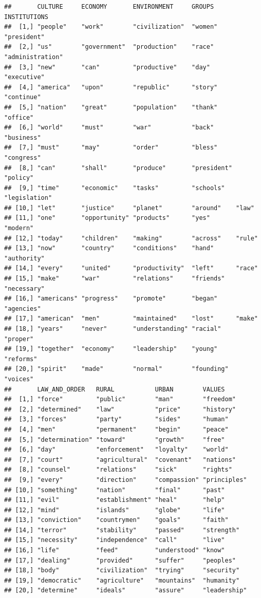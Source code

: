 \documentclass[
]{book}
\begin{document}
\begin{verbatim}
##       CULTURE     ECONOMY       ENVIRONMENT     GROUPS      INSTITUTIONS    
##  [1,] "people"    "work"        "civilization"  "women"     "president"     
##  [2,] "us"        "government"  "production"    "race"      "administration"
##  [3,] "new"       "can"         "productive"    "day"       "executive"     
##  [4,] "america"   "upon"        "republic"      "story"     "continue"      
##  [5,] "nation"    "great"       "population"    "thank"     "office"        
##  [6,] "world"     "must"        "war"           "back"      "business"      
##  [7,] "must"      "may"         "order"         "bless"     "congress"      
##  [8,] "can"       "shall"       "produce"       "president" "policy"        
##  [9,] "time"      "economic"    "tasks"         "schools"   "legislation"   
## [10,] "let"       "justice"     "planet"        "around"    "law"           
## [11,] "one"       "opportunity" "products"      "yes"       "modern"        
## [12,] "today"     "children"    "making"        "across"    "rule"          
## [13,] "now"       "country"     "conditions"    "hand"      "authority"     
## [14,] "every"     "united"      "productivity"  "left"      "race"          
## [15,] "make"      "war"         "relations"     "friends"   "necessary"     
## [16,] "americans" "progress"    "promote"       "began"     "agencies"      
## [17,] "american"  "men"         "maintained"    "lost"      "make"          
## [18,] "years"     "never"       "understanding" "racial"    "proper"        
## [19,] "together"  "economy"     "leadership"    "young"     "reforms"       
## [20,] "spirit"    "made"        "normal"        "founding"  "voices"        
##       LAW_AND_ORDER   RURAL           URBAN        VALUES      
##  [1,] "force"         "public"        "man"        "freedom"   
##  [2,] "determined"    "law"           "price"      "history"   
##  [3,] "forces"        "party"         "sides"      "human"     
##  [4,] "men"           "permanent"     "begin"      "peace"     
##  [5,] "determination" "toward"        "growth"     "free"      
##  [6,] "day"           "enforcement"   "loyalty"    "world"     
##  [7,] "court"         "agricultural"  "covenant"   "nations"   
##  [8,] "counsel"       "relations"     "sick"       "rights"    
##  [9,] "every"         "direction"     "compassion" "principles"
## [10,] "something"     "nation"        "final"      "past"      
## [11,] "evil"          "establishment" "heal"       "help"      
## [12,] "mind"          "islands"       "globe"      "life"      
## [13,] "conviction"    "countrymen"    "goals"      "faith"     
## [14,] "terror"        "stability"     "passed"     "strength"  
## [15,] "necessity"     "independence"  "call"       "live"      
## [16,] "life"          "feed"          "understood" "know"      
## [17,] "dealing"       "provided"      "suffer"     "peoples"   
## [18,] "body"          "civilization"  "trying"     "security"  
## [19,] "democratic"    "agriculture"   "mountains"  "humanity"  
## [20,] "determine"     "ideals"        "assure"     "leadership"
\end{verbatim}
\end{document}
